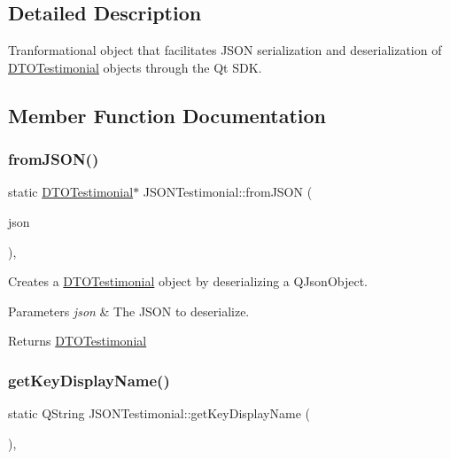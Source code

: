 \subsection{Detailed Description}
Tranformational object that facilitates J\+S\+ON serialization and deserialization of \mbox{\hyperlink{struct_d_t_o_testimonial}{D\+T\+O\+Testimonial}} objects through the Qt S\+DK. 



\subsection{Member Function Documentation}
\mbox{\label{struct_j_s_o_n_testimonial_a8b6b42ef202b1566b27b0d42a3074650}} 
\subsubsection{\texorpdfstring{fromJSON()}{fromJSON()}}
{\footnotesize\ttfamily static \mbox{\hyperlink{struct_d_t_o_testimonial}{D\+T\+O\+Testimonial}}$\ast$ J\+S\+O\+N\+Testimonial\+::from\+J\+S\+ON (\begin{DoxyParamCaption}\item[{const Q\+Json\+Object \&}]{json }\end{DoxyParamCaption})\hspace{0.3cm}{\ttfamily [inline]}, {\ttfamily [static]}}



Creates a \mbox{\hyperlink{struct_d_t_o_testimonial}{D\+T\+O\+Testimonial}} object by deserializing a Q\+Json\+Object. 


\begin{DoxyParams}{Parameters}
{\em json} & The J\+S\+ON to deserialize. \\
\hline
\end{DoxyParams}
\begin{DoxyReturn}{Returns}
\mbox{\hyperlink{struct_d_t_o_testimonial}{D\+T\+O\+Testimonial}} 
\end{DoxyReturn}
\mbox{\label{struct_j_s_o_n_testimonial_ab6d5712fea11f101268091f80e865e14}} 
\subsubsection{\texorpdfstring{getKeyDisplayName()}{getKeyDisplayName()}}
{\footnotesize\ttfamily static Q\+String J\+S\+O\+N\+Testimonial\+::get\+Key\+Display\+Name (\begin{DoxyParamCaption}{ }\end{DoxyParamCaption})\hspace{0.3cm}{\ttfamily [inline]}, {\ttfamily [static]}}



